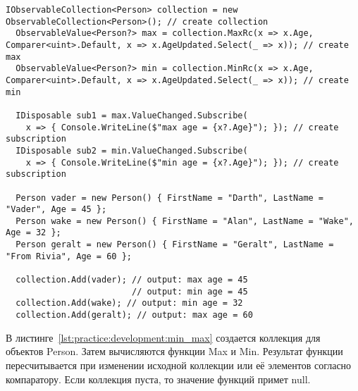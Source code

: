 \begin{lstlisting}[style=csharpinlinestyle, caption={Пример использования Min и Max}, label=lst:practice:development:min_max]
  IObservableCollection<Person> collection = new ObservableCollection<Person>(); // create collection
  ObservableValue<Person?> max = collection.MaxRc(x => x.Age, Comparer<uint>.Default, x => x.AgeUpdated.Select(_ => x)); // create max
  ObservableValue<Person?> min = collection.MinRc(x => x.Age, Comparer<uint>.Default, x => x.AgeUpdated.Select(_ => x)); // create min

  IDisposable sub1 = max.ValueChanged.Subscribe(
    x => { Console.WriteLine($"max age = {x?.Age}"); }); // create subscription
  IDisposable sub2 = min.ValueChanged.Subscribe(
    x => { Console.WriteLine($"min age = {x?.Age}"); }); // create subscription

  Person vader = new Person() { FirstName = "Darth", LastName = "Vader", Age = 45 };
  Person wake = new Person() { FirstName = "Alan", LastName = "Wake", Age = 32 };
  Person geralt = new Person() { FirstName = "Geralt", LastName = "From Rivia", Age = 60 };

  collection.Add(vader); // output: max age = 45
                         // output: min age = 45
  collection.Add(wake); // output: min age = 32
  collection.Add(geralt); // output: max age = 60
\end{lstlisting}

В листинге~\ref{lst:practice:development:min_max} создается коллекция для объектов Person. Затем вычисляются функции Max и Min.
Результат функции пересчитывается при изменении исходной коллекции или её элементов согласно компаратору. Если коллекция пуста, то значение функций примет null.
